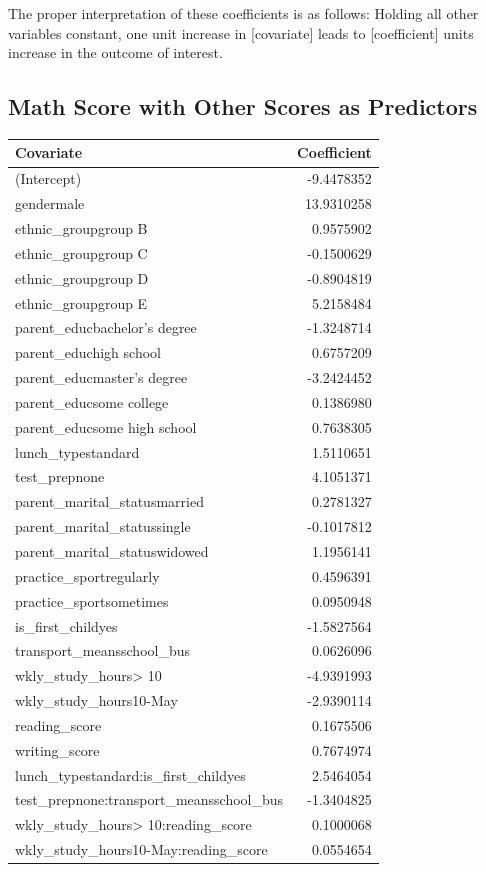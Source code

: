 \documentclass[
]{article}
\begin{document}
The proper interpretation of these coefficients is as follows: Holding
all other variables constant, one unit increase in {[}covariate{]} leads
to {[}coefficient{]} units increase in the outcome of interest.

\subsection{Math Score with Other Scores as
Predictors}\label{math-score-with-other-scores-as-predictors}

\begin{longtable}[]{@{}lr@{}}
\toprule\noalign{}
Covariate & Coefficient \\
\midrule\noalign{}
\endhead
\bottomrule\noalign{}
\endlastfoot
(Intercept) & -9.4478352 \\
gendermale & 13.9310258 \\
ethnic\_groupgroup B & 0.9575902 \\
ethnic\_groupgroup C & -0.1500629 \\
ethnic\_groupgroup D & -0.8904819 \\
ethnic\_groupgroup E & 5.2158484 \\
parent\_educbachelor's degree & -1.3248714 \\
parent\_educhigh school & 0.6757209 \\
parent\_educmaster's degree & -3.2424452 \\
parent\_educsome college & 0.1386980 \\
parent\_educsome high school & 0.7638305 \\
lunch\_typestandard & 1.5110651 \\
test\_prepnone & 4.1051371 \\
parent\_marital\_statusmarried & 0.2781327 \\
parent\_marital\_statussingle & -0.1017812 \\
parent\_marital\_statuswidowed & 1.1956141 \\
practice\_sportregularly & 0.4596391 \\
practice\_sportsometimes & 0.0950948 \\
is\_first\_childyes & -1.5827564 \\
transport\_meansschool\_bus & 0.0626096 \\
wkly\_study\_hours\textgreater{} 10 & -4.9391993 \\
wkly\_study\_hours10-May & -2.9390114 \\
reading\_score & 0.1675506 \\
writing\_score & 0.7674974 \\
lunch\_typestandard:is\_first\_childyes & 2.5464054 \\
test\_prepnone:transport\_meansschool\_bus & -1.3404825 \\
wkly\_study\_hours\textgreater{} 10:reading\_score & 0.1000068 \\
wkly\_study\_hours10-May:reading\_score & 0.0554654 \\
\end{longtable}
\end{document}
